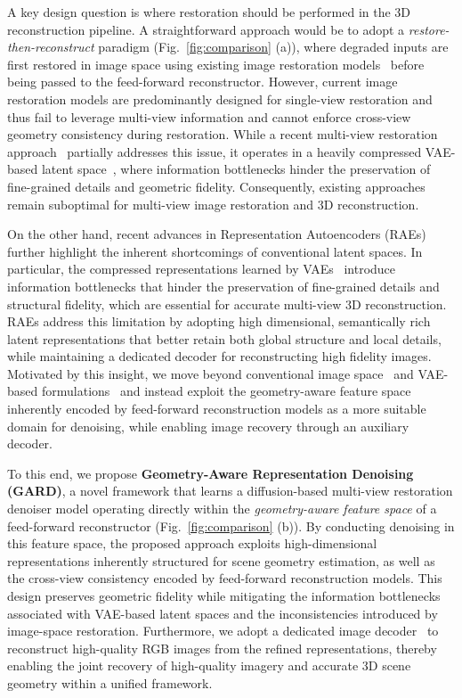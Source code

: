 \documentclass{llmxive}
\begin{document}
A key design question is where restoration should be performed in the 3D reconstruction pipeline. A straightforward approach would be to adopt a \textit{restore-then-reconstruct} paradigm (Fig.~\ref{fig:comparison} (a)), where degraded inputs are first restored in image space using existing image restoration models~\cite{zamir2022restormer, conde2024high, chen2023hierarchical, liang2024vrt, Youk_2024_CVPR, mao2025sir, zamfir2024complexityexperts} before being passed to the feed-forward reconstructor. However, current image restoration models are predominantly designed for single-view restoration and thus fail to leverage multi-view information and cannot enforce cross-view geometry consistency during restoration. While a recent multi-view restoration approach~\cite{mao2025sir} partially addresses this issue, it operates in a heavily compressed VAE-based latent space~\cite {kingma2013auto}, where information bottlenecks hinder the preservation of fine-grained details and geometric fidelity. Consequently, existing approaches remain suboptimal for multi-view image restoration and 3D reconstruction.

On the other hand, recent advances in Representation Autoencoders (RAEs)~\cite{zheng2025diffusion, tong2026scaling, kumar2026learning} further highlight the inherent shortcomings of conventional latent spaces. In particular, the compressed representations learned by VAEs~\cite{kingma2013auto, yao2025reconstruction} introduce information bottlenecks that hinder the preservation of fine-grained details and structural fidelity, which are essential for accurate multi-view 3D reconstruction. RAEs address this limitation by adopting high dimensional, semantically rich latent representations that better retain both global structure and local details, while maintaining a dedicated decoder for reconstructing high fidelity images. Motivated by this insight, we move beyond conventional image space~\cite{zamir2022restormer, chen2023hierarchical, conde2024high, liang2024vrt, Youk_2024_CVPR} and VAE-based formulations~\cite{mao2025sir} and instead exploit the geometry-aware feature space inherently encoded by feed-forward reconstruction models as a more suitable domain for denoising, while enabling image recovery through an auxiliary decoder.

To this end, we propose \textbf{Geometry-Aware Representation Denoising (GARD)}, a novel framework that learns a diffusion-based multi-view restoration denoiser model operating directly within the \textit{geometry-aware feature space} of a feed-forward reconstructor (Fig.~\ref{fig:comparison} (b)). By conducting denoising in this feature space, the proposed approach exploits high-dimensional representations inherently structured for scene geometry estimation, as well as the cross-view consistency encoded by feed-forward reconstruction models. This design preserves geometric fidelity while mitigating the information bottlenecks associated with VAE-based latent spaces and the inconsistencies introduced by image-space restoration. Furthermore, we adopt a dedicated image decoder~\cite{jang2026gld} to reconstruct high-quality RGB images from the refined representations, thereby enabling the joint recovery of high-quality imagery and accurate 3D scene geometry within a unified framework.
\end{document}
